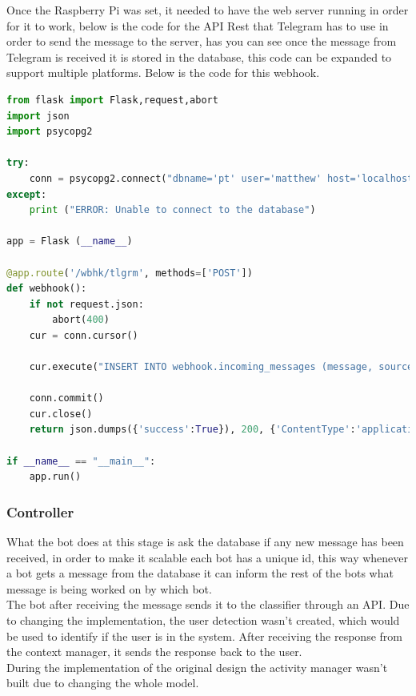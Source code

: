 Once the Raspberry  Pi was set, it needed to have the web server running in order for it to work, below is the code for the API Rest that Telegram has to use in order to send the message to the server, has you can see once the message from Telegram is received it is stored in the database, this code can be expanded to support multiple platforms. Below is the code for this webhook.

\begin{lstlisting}[language=Python,caption={Webhook Code},captionpos=b]
from flask import Flask,request,abort
import json
import psycopg2

try:
	conn = psycopg2.connect("dbname='pt' user='matthew' host='localhost' password=***")
except:
	print ("ERROR: Unable to connect to the database")

app = Flask (__name__)

@app.route('/wbhk/tlgrm', methods=['POST'])
def webhook():
	if not request.json:
		abort(400)
	cur = conn.cursor()
	
	cur.execute("INSERT INTO webhook.incoming_messages (message, source) VALUES ('"+json.dumps(request.json)+"', 'Telegram')")
	
	conn.commit()
	cur.close()
	return json.dumps({'success':True}), 200, {'ContentType':'application/json'}
	
if __name__ == "__main__":
	app.run() 

\end{lstlisting}

\subsubsection{Controller}\label{sec:chap4_ori_imp_ctrl}

What the bot does at this stage is ask the database if any new message has been received, in order to make it scalable each bot has a unique id, this way whenever a bot gets a message from the database it can inform the rest of the bots what message is being worked on by which bot.\\
The bot after receiving the message sends it to the classifier through an API. Due to changing the implementation, the user detection wasn’t created, which would be used to identify if the user is in the system. After receiving the response from the context manager, it sends the response back to the user.\\
During the implementation of the original design the activity manager wasn’t built due to changing the whole model.

